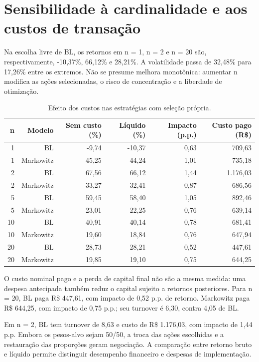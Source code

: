 \clearpage
\section{Sensibilidade à cardinalidade e aos custos de transação}
Na escolha livre de BL, os retornos em n = 1, n = 2 e n = 20 são, respectivamente, -10,37\%, 66,12\% e 28,21\%. A volatilidade passa de 32,48\% para 17,26\% entre os extremos. Não se presume melhora monotônica: aumentar n modifica as ações selecionadas, o risco de concentração e a liberdade de otimização.

\begin{table}[H]
\centering
\caption{Efeito dos custos nas estratégias com seleção própria.}
{\footnotesize
\begin{tabular}{@{}rrrrrr@{}}
\hline
n & Modelo & Sem custo (\%) & Líquido (\%) & Impacto (p.p.) & Custo pago (R\$) \\ \hline
1 & BL & -9,74 & -10,37 & 0,63 & 709,63 \\
1 & Markowitz & 45,25 & 44,24 & 1,01 & 735,18 \\
2 & BL & 67,56 & 66,12 & 1,44 & 1.176,03 \\
2 & Markowitz & 33,27 & 32,41 & 0,87 & 686,56 \\
5 & BL & 59,45 & 58,40 & 1,05 & 892,46 \\
5 & Markowitz & 23,01 & 22,25 & 0,76 & 639,14 \\
10 & BL & 40,91 & 40,14 & 0,78 & 681,41 \\
10 & Markowitz & 19,60 & 18,84 & 0,76 & 647,94 \\
20 & BL & 28,73 & 28,21 & 0,52 & 447,61 \\
20 & Markowitz & 19,85 & 19,10 & 0,75 & 644,25 \\
\hline
\end{tabular}}
\par{}
\end{table}
O custo nominal pago e a perda de capital final não são a mesma medida: uma despesa antecipada também reduz o capital sujeito a retornos posteriores. Para n = 20, BL paga R\$ 447,61, com impacto de 0,52 p.p. de retorno. Markowitz paga R\$ 644,25, com impacto de 0,75 p.p.; seu turnover é 6,30, contra 4,05 de BL.

Em n = 2, BL tem turnover de 8,63 e custo de R\$ 1.176,03, com impacto de 1,44 p.p. Embora os pesos-alvo sejam 50/50, a troca das ações escolhidas e a restauração das proporções geram negociação. A comparação entre retorno bruto e líquido permite distinguir desempenho financeiro e despesas de implementação.

